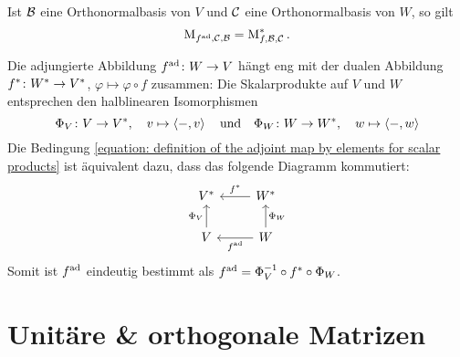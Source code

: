 \begin{lemma}
  Ist $\mathcal{B}$ eine Orthonormalbasis von $V$ und $\mathcal{C}$ eine Orthonormalbasis von $W$, so gilt
  \[
      \operatorname{M}_{f^{\operatorname{ad}}, \mathcal{C}, \mathcal{B}}
    = \operatorname{M}_{f, \mathcal{B}, \mathcal{C}} ^*.
  \]
\end{lemma}

Die adjungierte Abbildung $f^{\operatorname{ad}} \colon W \to V$ hängt eng mit der dualen Abbildung $f^* \colon W^* \to V^*$, $\varphi \mapsto \varphi \circ f$ zusammen:
Die Skalarprodukte auf $V$ und $W$ entsprechen den halblinearen Isomorphismen
\[
          \Phi_V
  \colon  V
  \to     V^*,
  \quad   v
  \mapsto \left\langle -, v \right\rangle
  \quad\text{und}\quad
  \Phi_W
  \colon  W
  \to     W^*,
  \quad   w
  \mapsto \left\langle -, w \right\rangle
\]
Die Bedingung \eqref{equation: definition of the adjoint map by elements for scalar products} ist äquivalent dazu, dass das folgende Diagramm kommutiert:
\[
  \begin{tikzcd}
      V^*
    & W^*
      \arrow[swap]{l}{\dual{f}}
    \\
      V
      \arrow{u}{\Phi_V}
    & W
      \arrow[swap]{u}{\Phi_W}
      \arrow{l}{\adj{f}}
  \end{tikzcd}
\]
Somit ist $f^{\operatorname{ad}}$ eindeutig bestimmt als $f^{\operatorname{ad}} = \Phi_V^{-1} \circ f^* \circ \Phi_W$.



\section{Unitäre \& orthogonale Matrizen}

